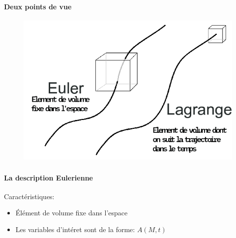 \section{\fstpti}

\begin{frame}
\frametitle{\fstpti}
\framesubtitle{Deux points de vue}

\begin{figure}
	\centering
	\includegraphics[width=0.8\linewidth]{figures/eulerian_vs_lagrangian_description.png}
\end{figure}

\end{frame}


\begin{frame}
\frametitle{\fstpti}
\framesubtitle{La description Eulerienne}

\noindent
\begin{minipage}[t]{0.6\textwidth}
	Caractéristiques:
	\begin{itemize}
		\item Élément de volume fixe dans l'espace
		\item Les variables d'intéret sont de la forme: $A(M,t)$
	\end{itemize}
\end{minipage}%
\begin{minipage}[t]{0.4\textwidth}
\end{minipage}


\end{frame}



